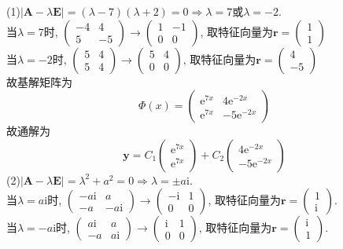 \documentclass[titlepage,11pt,a4paper,twoside]{report}
\makeatletter
\newcommand\e{\mathrm{e}}
\newcommand\ii{\mathrm{i}}
\newcommand\bmitPhi{\bm{\varPhi}}
\newenvironment{solve}{\par
	\pushQED{\qed}%
	\normalfont \topsep1\p@\@plus6\p@\relax
	\trivlist
	\item\relax
	{\hspace*{\parindent}{\heiti 解}\@addpunct{:}}\hspace\labelsep\ignorespaces
}{%
	\popQED\endtrivlist\@endpefalse
}
\makeatother
\begin{document}
\begin{solve}
(1)$|\bm{A}-\lambda\bm{E}|=(\lambda-7)(\lambda+2)=0\Rightarrow\lambda=7$或$\lambda=-2$.\\
当$\lambda=7$时, $\begin{pmatrix}-4&4\\5&-5\end{pmatrix}\to\begin{pmatrix}1&-1\\0&0\end{pmatrix}$, 取特征向量为$\bm{r}=\begin{pmatrix}1\\1\end{pmatrix}$\\
当$\lambda=-2$时, $\begin{pmatrix}5&4\\5&4\end{pmatrix}\to\begin{pmatrix}5&4\\0&0\end{pmatrix}$, 取特征向量为$\bm{r}=\begin{pmatrix}4\\-5\end{pmatrix}$\\
故基解矩阵为\[\bmitPhi(x)=\begin{pmatrix}\e^{7x}&4\e^{-2x}\\\e^{7x}&-5\e^{-2x}\end{pmatrix}\]
故通解为\[\bm{y}=C_1\begin{pmatrix}\e^{7x}\\\e^{7x}\end{pmatrix}+C_2\begin{pmatrix}4\e^{-2x}\\-5\e^{-2x}\end{pmatrix}\]
(2)$|\bm{A}-\lambda\bm{E}|=\lambda^2+a^2=0\Rightarrow\lambda=\pm a\ii$.\\
当$\lambda=a\ii$时, $\begin{pmatrix}-a\ii&a\\-a&-a\ii\end{pmatrix}\to\begin{pmatrix}-\ii&1\\0&0\end{pmatrix}$, 取特征向量为$\bm{r}=\begin{pmatrix}1\\\ii\end{pmatrix}$.\\
当$\lambda=-a\ii$时, $\begin{pmatrix}a\ii&a\\-a&a\ii\end{pmatrix}\to\begin{pmatrix}\ii&1\\0&0\end{pmatrix}$, 取特征向量为$\bm{r}=\begin{pmatrix}\ii\\1\end{pmatrix}$.\\

\end{solve}
\end{document}
